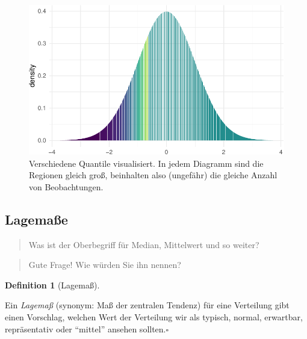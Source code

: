 \documentclass[
  letterpaper,
  DIV=11,
  numbers=noendperiod]{scrartcl}
\theoremstyle{definition}
\theoremstyle{definition}
\theoremstyle{definition}
\newtheorem{definition}{Definition}[section]
\theoremstyle{remark}
\begin{document}
\begin{figure}
{\begin{verbatim}
\end{verbatim}

\includegraphics{050-zusammenfassen_files/figure-pdf/unnamed-chunk-19-1.pdf}

}

\caption{\label{fig-quantile-mosaic}Verschiedene Quantile visualisiert.
In jedem Diagramm sind die Regionen gleich groß, beinhalten also
(ungefähr) die gleiche Anzahl von Beobachtungen.}

\end{figure}%

\subsection{Lagemaße}\label{sec-lage}

\begin{quote}
{} Was ist der Oberbegriff für Median, Mittelwert und so
weiter?
\end{quote}

\begin{quote}
{} Gute Frage! Wie würden Sie ihn nennen?
\end{quote}

\begin{definition}[Lagemaß]\protect\hypertarget{def-lage}{}\label{def-lage}

Ein \emph{Lagemaß} (synonym: Maß der zentralen Tendenz) für eine
Verteilung gibt einen Vorschlag, welchen Wert der Verteilung wir als
typisch, normal, erwartbar, repräsentativ oder ``mittel'' ansehen
sollten.\(\square\)

\end{definition}
\end{document}
